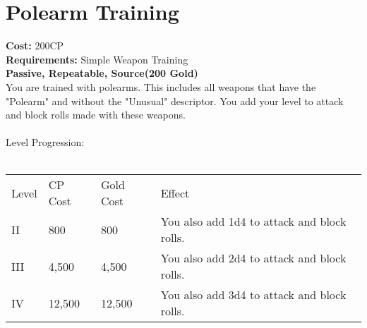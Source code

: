 \section{Polearm Training}\label{perk:polearmTraining}
\textbf{Cost:} 200CP\\
\textbf{Requirements:} Simple Weapon Training\\
\textbf{Passive, Repeatable, Source(200 Gold)}\\
You are trained with polearms.
This includes all weapons that have the "Polearm" and without the "Unusual" descriptor.
You add your level to attack and block rolls made with these weapons.\\
\\
Level Progression:\\
\\
\begin{tabular}{l | l | l | l}
	Level & CP Cost & Gold Cost & Effect\\
	II & 800 & 800 & You also add 1d4 to attack and block rolls.\\
	III & 4,500 & 4,500 & You also add 2d4 to attack and block rolls.\\
	IV & 12,500 & 12,500 & You also add 3d4 to attack and block rolls.\\
\end{tabular}